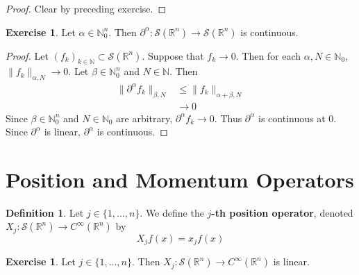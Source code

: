 \documentclass{book}
\theoremstyle{definition}
\newtheorem{defn}[definition]{Definition}
\newtheorem{ex}[definition]{Exercise}
\newcommand{\al}{\alpha}
\newcommand{\be}{\beta}
\newcommand{\N}{\mathbb{N}}
\newcommand{\R}{\mathbb{R}}
\newcommand{\MS}{\mathcal{S}}
\DeclareMathOperator*{\0}{\mbf{0}}
\DeclareMathOperator*{\1}{\mbf{1}}
\newcommand{\p}{\partial}
\begin{document}
	\begin{proof}
		Clear by preceding exercise.
	\end{proof}

	\begin{ex}
		Let $\al \in \N_0^n$. Then $\p^{\al}: \MS(\R^n) \rightarrow \MS(\R^n)$ is continuous.
	\end{ex}

	\begin{proof}
			Let $(f_k)_{k \in \N} \subset \MS(\R^n)$. Suppose that $f_k \rightarrow 0$. Then for each $\al, N \in \N_0$, $\|f_k\|_{\al, N} \rightarrow 0$. Let $\be \in \N_0^n$ and $N \in \N$. Then
		\begin{align*}
			\|\p^{\al}f_k\|_{\be, N} 
			& \leq \|f_k \|_{\al + \be, N} \\
			& \rightarrow 0
		\end{align*}
		Since $\be \in \N_0^n$ and $N \in \N_0$ are arbitrary, $\p^{\al}f_k \rightarrow 0$. Thus $\p^{\al}$ is continuous at $0$. Since $\p^{\al}$ is linear, $\p^{\al}$ is continuous. 
	\end{proof}




































	\newpage
	\section{Position and Momentum Operators}
	\begin{defn}
		Let $j \in \{1, \ldots, n\}$. We define the \textbf{$j$-th position operator}, denoted $X_j: \MS(\R^n) \rightarrow C^{\infty}(\R^n)$ by 
		$$X_jf(x) = x_j f(x)$$
	\end{defn}

	\begin{ex}
		Let $j \in \{1, \ldots, n\}$. Then $X_j: \MS(\R^n) \rightarrow C^{\infty}(\R^n)$ is linear.
	\end{ex}
\end{document}
